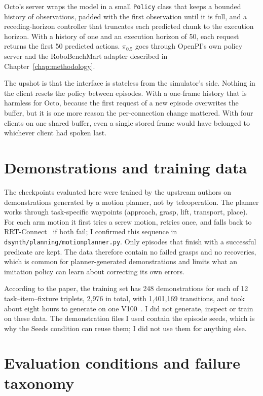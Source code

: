Octo's server wraps the model in a small \texttt{Policy} class that keeps a bounded history of observations, padded with the first observation until it is full, and a receding-horizon controller that truncates each predicted chunk to the execution horizon. With a history of one and an execution horizon of 50, each request returns the first 50 predicted actions. $\pi_{0.5}$ goes through OpenPI's own policy server and the RoboBenchMart adapter described in Chapter~\ref{chap:methodology}.

The upshot is that the interface is stateless from the simulator's side. Nothing in the client resets the policy between episodes. With a one-frame history that is harmless for Octo, because the first request of a new episode overwrites the buffer, but it is one more reason the per-connection change mattered. With four clients on one shared buffer, even a single stored frame would have belonged to whichever client had spoken last.

\section{Demonstrations and training data}
\label{sec:demos}

The checkpoints evaluated here were trained by the upstream authors on demonstrations generated by a motion planner, not by teleoperation. The planner works through task-specific waypoints (approach, grasp, lift, transport, place). For each arm motion it first tries a screw motion, retries once, and falls back to RRT-Connect~\cite{kuffner2000rrt} if both fail; I confirmed this sequence in \texttt{dsynth/planning/motionplanner.py}. Only episodes that finish with a successful predicate are kept. The data therefore contain no failed grasps and no recoveries, which is common for planner-generated demonstrations and limits what an imitation policy can learn about correcting its own errors.

According to the paper, the training set has 248 demonstrations for each of 12 task--item--fixture triplets, 2,976 in total, with 1,401,169 transitions, and took about eight hours to generate on one V100~\cite{soshin2025robobenchmart}. I did not generate, inspect or train on these data. The demonstration files I used contain the episode seeds, which is why the Seeds condition can reuse them; I did not use them for anything else.

\section{Evaluation conditions and failure taxonomy}

